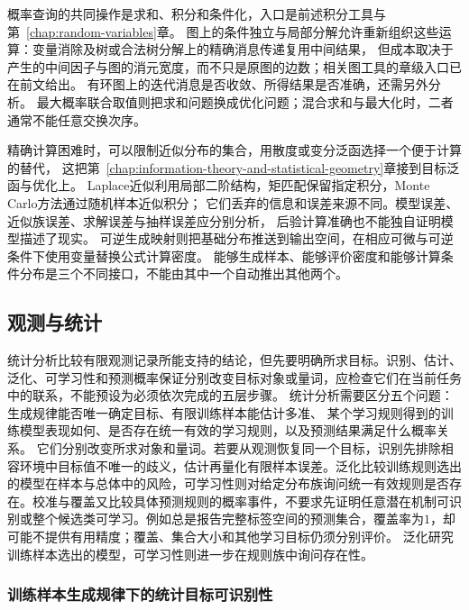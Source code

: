 概率查询的共同操作是求和、积分和条件化，入口是前述积分工具与第~\ref{chap:random-variables}章。
图上的条件独立与局部分解允许重新组织这些运算：变量消除及树或合法树分解上的精确消息传递复用中间结果，
但成本取决于产生的中间因子与图的消元宽度，而不只是原图的边数；相关图工具的章级入口已在前文给出。
有环图上的迭代消息是否收敛、所得结果是否准确，还需另外分析。
最大概率联合取值则把求和问题换成优化问题；混合求和与最大化时，二者通常不能任意交换次序。

精确计算困难时，可以限制近似分布的集合，用散度或变分泛函选择一个便于计算的替代，
这把第~\ref{chap:information-theory-and-statistical-geometry}章接到目标泛函与优化上。
Laplace近似利用局部二阶结构，矩匹配保留指定积分，Monte Carlo方法通过随机样本近似积分；
它们丢弃的信息和误差来源不同。模型误差、近似族误差、求解误差与抽样误差应分别分析，
后验计算准确也不能独自证明模型描述了现实。
可逆生成映射则把基础分布推送到输出空间，在相应可微与可逆条件下使用变量替换公式计算密度。
能够生成样本、能够评价密度和能够计算条件分布是三个不同接口，不能由其中一个自动推出其他两个。

\subsection{观测与统计}
\label{sec:future-data-law-object-map}
\label{sec:future-information-proxy-map}
\label{sec:future-generalization-learnability-map}
\label{sec:future-reliability-map}
\label{sec:future-fairness-alignment-interpretation-map}

统计分析比较有限观测记录所能支持的结论，但先要明确所求目标。识别、估计、泛化、可学习性和预测概率保证分别改变目标对象或量词，应检查它们在当前任务中的联系，不能预设为必须依次完成的五层步骤。
统计分析需要区分五个问题：生成规律能否唯一确定目标、有限训练样本能估计多准、
某个学习规则得到的训练模型表现如何、是否存在统一有效的学习规则，以及预测结果满足什么概率关系。
它们分别改变所求对象和量词。若要从观测恢复同一个目标，识别先排除相容环境中目标值不唯一的歧义，估计再量化有限样本误差。泛化比较训练规则选出的模型在样本与总体中的风险，可学习性则对给定分布族询问统一有效规则是否存在。校准与覆盖又比较具体预测规则的概率事件，不要求先证明任意潜在机制可识别或整个候选类可学习。例如总是报告完整标签空间的预测集合，覆盖率为\(1\)，却可能不提供有用精度；覆盖、集合大小和其他学习目标仍须分别评价。
泛化研究训练样本选出的模型，可学习性则进一步在规则族中询问存在性。

\subsubsection{训练样本生成规律下的统计目标可识别性}
\label{sec:future-analysis-identification}

